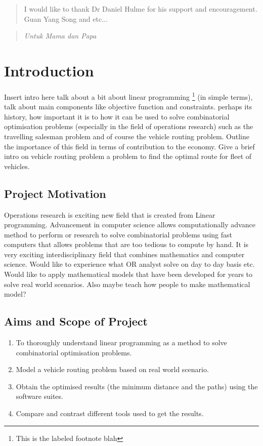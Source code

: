 \documentclass[a4paper, 12pt]{report}
\begin{document}
\renewcommand{\abstractname}{Acknowledgements}
\begin{abstract}
\centering
I would like to thank Dr Daniel Hulme for his support and encouragement. Guan Yang Song and etc...
\end{abstract}

\renewcommand{\abstractname}{}
\begin{abstract}
\centering
\textit{Untuk Mama dan Papa}
\end{abstract}

\tableofcontents

\chapter{Introduction}
Insert intro here talk about a bit about linear programming \footnote{\label{note1}This is the labeled footnote blah}
(in simple terms), talk about main components like objective function and constraints. perhaps its history, how
important it  is to how it can be used to solve combinatorial optimisation problems (especially in the field of
operations research) such as the travelling salesman problem and of course the vehicle routing problem. Outline the
importance of this field in terms of contribution to the economy.
 Give a brief intro on vehicle routing problem a problem to find the optimal route for fleet of vehicles.


\section{Project Motivation}
Operations research is exciting new field that is created from Linear programming. Advancement in computer science
allows computationally advance method to perform or research to solve combinatorial problems using fast computers that
allows problems that are too tedious to compute by hand. It is very exciting interdisciplinary field that combines
mathematics and computer science.  Would like to experience what OR analyst solve on day to day basis etc. Would like
to apply mathematical models that have been developed for years to solve real world scenarios. Also maybe teach how
people to make mathematical model?

\section{Aims and Scope of Project}
\begin{enumerate}
\item To thoroughly understand linear programming as a method to solve combinatorial optimisation problems.
\item Model a vehicle routing problem based on real world scenario.
\item Obtain the optimised results (the minimum distance and the paths) using the software suites.
\item Compare and contrast different tools used to get the results.
\end{enumerate}
\end{document}
